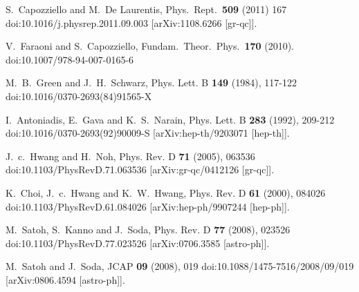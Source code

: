 \documentclass{article}
\begin{document}
\begin{thebibliography}{99}
S.~Capozziello and M.~De Laurentis,
Phys.\ Rept.\ {\bf 509} (2011) 167
doi:10.1016/j.physrep.2011.09.003 [arXiv:1108.6266 [gr-qc]].

V.~Faraoni and S.~Capozziello,
Fundam.\ Theor.\ Phys.\ {\bf 170} (2010).
doi:10.1007/978-94-007-0165-6


M.~B.~Green and J.~H.~Schwarz,
Phys. Lett. B \textbf{149} (1984), 117-122
doi:10.1016/0370-2693(84)91565-X

I.~Antoniadis, E.~Gava and K.~S.~Narain,
Phys. Lett. B \textbf{283} (1992), 209-212
doi:10.1016/0370-2693(92)90009-S
[arXiv:hep-th/9203071 [hep-th]].

J.~c.~Hwang and H.~Noh,
Phys. Rev. D \textbf{71} (2005), 063536
doi:10.1103/PhysRevD.71.063536
[arXiv:gr-qc/0412126 [gr-qc]].


K.~Choi, J.~c.~Hwang and K.~W.~Hwang,
Phys. Rev. D \textbf{61} (2000), 084026
doi:10.1103/PhysRevD.61.084026
[arXiv:hep-ph/9907244 [hep-ph]].


M.~Satoh, S.~Kanno and J.~Soda,
Phys. Rev. D \textbf{77} (2008), 023526
doi:10.1103/PhysRevD.77.023526
[arXiv:0706.3585 [astro-ph]].


M.~Satoh and J.~Soda,
JCAP \textbf{09} (2008), 019
doi:10.1088/1475-7516/2008/09/019
[arXiv:0806.4594 [astro-ph]].



\end{thebibliography}
\end{document}
